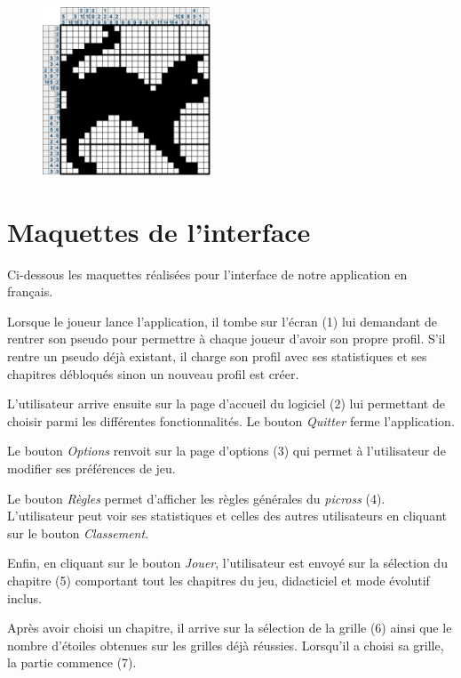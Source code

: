 \documentclass{report}
\begin{document}
\begin{figure}[H]
			\hspace{1cm}
			\includegraphics[width=5cm]{../Images/cat/cat6.png}
		\end{figure}
		
	
	\section{Maquettes de l'interface}
      
      		Ci-dessous les maquettes réalisées pour l'interface de notre application en français. 
      		
      		Lorsque le joueur lance l'application, il tombe sur l'écran (1) lui demandant de rentrer son pseudo pour permettre à chaque joueur d'avoir son propre profil. S'il rentre un pseudo déjà existant, il charge son profil avec ses statistiques et ses chapitres débloqués sinon un nouveau profil est créer. 
      		
      		L'utilisateur arrive ensuite sur la page d'accueil du logiciel (2) lui permettant de choisir parmi les différentes fonctionnalités. Le bouton \textit{Quitter} ferme l'application. 
      		
      		Le bouton \textit{Options} renvoit sur la page d'options (3) qui permet à l'utilisateur de modifier ses préférences de jeu. 
      		
      		Le bouton \textit{Règles}  permet d'afficher les règles générales du \textit{picross} (4). L'utilisateur peut voir ses statistiques et celles des autres utilisateurs en cliquant sur le bouton \textit{Classement}. 
      		
      		Enfin, en cliquant sur le bouton \textit{Jouer}, l'utilisateur est envoyé sur la sélection du  chapitre (5) comportant tout les chapitres du jeu, didacticiel et mode évolutif inclus. 
      		
      		Après avoir choisi un chapitre, il arrive sur la sélection de la grille (6) ainsi que le nombre d'étoiles obtenues sur les grilles déjà réussies. Lorsqu'il a choisi sa grille, la partie commence (7).
		
\end{document}
